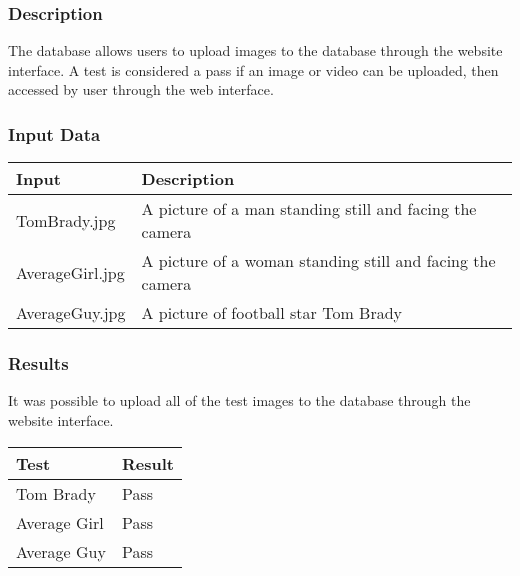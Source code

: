 \documentclass{scrreprt}
\begin{document}
\subsubsection{Description}

The database allows users to upload images to the database through the website
interface. A test is considered a pass if an image or video can be uploaded,
then accessed by user through the web interface.

\subsubsection{Input Data}

\begin{table}[H]
        \centering
        \begin{tabular}{p{3cm}p{6cm}}
                \hline\hline
                Input & Description\\
                \hline\hline
                TomBrady.jpg &  A picture of a man standing still and facing the camera\\ %
                \hline
                AverageGirl.jpg &  A picture of a woman standing still and facing the camera\\ %
                \hline
                AverageGuy.jpg &  A picture of football star Tom Brady\\ %
                \hline
        \end{tabular}
\end{table}

\subsubsection{Results}

It was possible to upload all of the test images to the database through the
website interface.

\begin{table}[H]
        \centering
        \begin{tabular}{||p{2.5cm}|p{2.5cm}||}
                \hline
                \textbf Test & \textbf Result\\
                \hline\hline
                Tom Brady & Pass  \\
                \hline\hline
                Average Girl & Pass  \\
                \hline\hline
                Average Guy & Pass  \\
                \hline
        \end{tabular}
\end{table}
\end{document}
